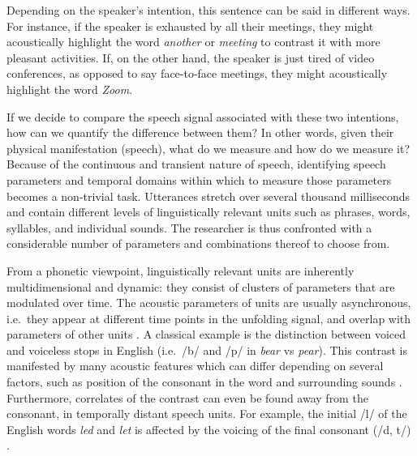 \documentclass[Review,times,sageh]{sagej}
\begin{document}
Depending on the speaker's intention, this sentence can be said in different ways.
For instance, if the speaker is exhausted by all their meetings, they might acoustically highlight the word \emph{another} or \emph{meeting} to contrast it with more pleasant activities.
If, on the other hand, the speaker is just tired of video conferences, as opposed to say face-to-face meetings, they might acoustically highlight the word \emph{Zoom}.

If we decide to compare the speech signal associated with these two intentions, how can we quantify the difference between them?
In other words, given their physical manifestation (speech), what do we measure and how do we measure it?
Because of the continuous and transient nature of speech, identifying speech parameters and temporal domains within which to measure those parameters becomes a non-trivial task.
Utterances stretch over several thousand milliseconds and contain different levels of linguistically relevant units such as phrases, words, syllables, and individual sounds.
The researcher is thus confronted with a considerable number of parameters and combinations thereof to choose from.

From a phonetic viewpoint, linguistically relevant units are inherently multidimensional and dynamic: they consist of clusters of parameters that are modulated over time.
The acoustic parameters of units are usually asynchronous, i.e.~they appear at different time points in the unfolding signal, and overlap with parameters of other units \citep[e.g.][]{jongman2000acoustic, lisker1986voicing, summerfield1981articulatory, winter2014spoken}.
A classical example is the distinction between voiced and voiceless stops in English (i.e.~/b/ and /p/ in \emph{bear} vs \emph{pear}).
This contrast is manifested by many acoustic features which can differ depending on several factors, such as position of the consonant in the word and surrounding sounds \citep{lisker1977rapid}.
Furthermore, correlates of the contrast can even be found away from the consonant, in temporally distant speech units.
For example, the initial /l/ of the English words \emph{led} and \emph{let} is affected by the voicing of the final consonant (/d, t/) \citep{hawkins2004influence}.
\end{document}
